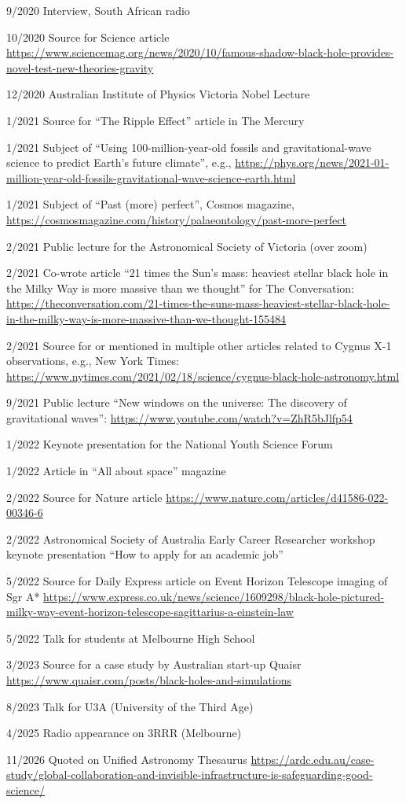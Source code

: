 \documentclass[margin,line]{res}
\begin{document}
\begin{resume}
9/2020	Interview, South African radio

10/2020	Source for Science article \url{https://www.sciencemag.org/news/2020/10/famous-shadow-black-hole-provides-novel-test-new-theories-gravity}
	  
12/2020	Australian Institute of Physics Victoria Nobel Lecture

1/2021	Source for ``The Ripple Effect'' article in The Mercury

1/2021 	Subject of ``Using 100-million-year-old fossils and gravitational-wave science to predict Earth's future climate'', e.g., \url{https://phys.org/news/2021-01-million-year-old-fossils-gravitational-wave-science-earth.html}

1/2021	Subject of ``Past (more) perfect'', Cosmos magazine, \url{https://cosmosmagazine.com/history/palaeontology/past-more-perfect}

2/2021 	Public lecture for the Astronomical Society of Victoria (over zoom)

2/2021 	Co-wrote article ``21 times the Sun's mass: heaviest stellar black hole in the Milky Way is more massive than we thought'' for The Conversation: \url{https://theconversation.com/21-times-the-suns-mass-heaviest-stellar-black-hole-in-the-milky-way-is-more-massive-than-we-thought-155484}

2/2021	Source for or mentioned in multiple other articles related to Cygnus X-1 observations, e.g., New York Times: \url{https://www.nytimes.com/2021/02/18/science/cygnus-black-hole-astronomy.html}
	  
9/2021	Public lecture ``New windows on the universe: The discovery of gravitational waves'': \url{https://www.youtube.com/watch?v=ZhR5bJlfp54}

1/2022	Keynote presentation for the National Youth Science Forum

1/2022	Article in ``All about space'' magazine
	  
2/2022  	Source for Nature article \url{https://www.nature.com/articles/d41586-022-00346-6}

2/2022	Astronomical Society of Australia Early Career Researcher workshop keynote presentation ``How to apply for an academic job'' 

5/2022	Source for Daily Express article on Event Horizon Telescope imaging of Sgr A* \url{https://www.express.co.uk/news/science/1609298/black-hole-pictured-milky-way-event-horizon-telescope-sagittarius-a-einstein-law}

5/2022	Talk for students at Melbourne High School

3/2023	Source for a case study by Australian start-up Quaisr \url{https://www.quaisr.com/posts/black-holes-and-simulations}

8/2023	Talk for U3A (University of the Third Age)

4/2025	Radio appearance on 3RRR (Melbourne)

11/2026	Quoted on Unified Astronomy Thesaurus \url{https://ardc.edu.au/case-study/global-collaboration-and-invisible-infrastructure-is-safeguarding-good-science/}

	  
\end{resume}
\end{document}
